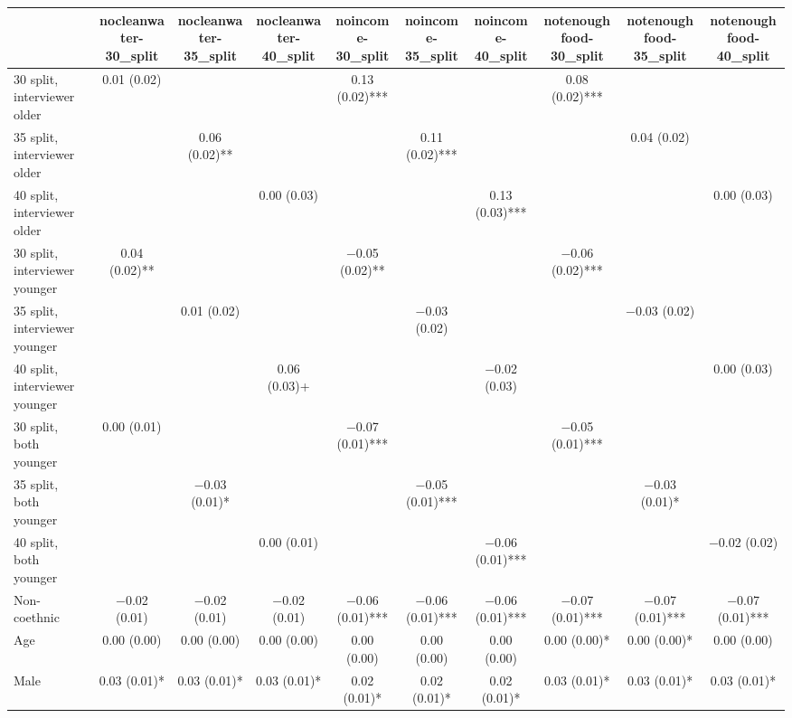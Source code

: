 \begin{table}
\centering
\begin{tabular}[t]{lccccccccc}
\toprule
  & nocleanwater-30\_split & nocleanwater-35\_split & nocleanwater-40\_split & noincome-30\_split & noincome-35\_split & noincome-40\_split & notenoughfood-30\_split & notenoughfood-35\_split & notenoughfood-40\_split\\
\midrule
30 split, interviewer older & \num{0.01} (\num{0.02}) &  &  & \num{0.13} (\num{0.02})*** &  &  & \num{0.08} (\num{0.02})*** &  & \\
35 split, interviewer older &  & \num{0.06} (\num{0.02})** &  &  & \num{0.11} (\num{0.02})*** &  &  & \num{0.04} (\num{0.02}) & \\
40 split, interviewer older &  &  & \num{0.00} (\num{0.03}) &  &  & \num{0.13} (\num{0.03})*** &  &  & \num{0.00} (\num{0.03})\\
30 split, interviewer younger & \num{0.04} (\num{0.02})** &  &  & \num{-0.05} (\num{0.02})** &  &  & \num{-0.06} (\num{0.02})*** &  & \\
35 split, interviewer younger &  & \num{0.01} (\num{0.02}) &  &  & \num{-0.03} (\num{0.02}) &  &  & \num{-0.03} (\num{0.02}) & \\
40 split, interviewer younger &  &  & \num{0.06} (\num{0.03})+ &  &  & \num{-0.02} (\num{0.03}) &  &  & \num{0.00} (\num{0.03})\\
30 split, both younger & \num{0.00} (\num{0.01}) &  &  & \num{-0.07} (\num{0.01})*** &  &  & \num{-0.05} (\num{0.01})*** &  & \\
35 split, both younger &  & \num{-0.03} (\num{0.01})* &  &  & \num{-0.05} (\num{0.01})*** &  &  & \num{-0.03} (\num{0.01})* & \\
40 split, both younger &  &  & \num{0.00} (\num{0.01}) &  &  & \num{-0.06} (\num{0.01})*** &  &  & \num{-0.02} (\num{0.02})\\
Non-coethnic & \num{-0.02} (\num{0.01}) & \num{-0.02} (\num{0.01}) & \num{-0.02} (\num{0.01}) & \num{-0.06} (\num{0.01})*** & \num{-0.06} (\num{0.01})*** & \num{-0.06} (\num{0.01})*** & \num{-0.07} (\num{0.01})*** & \num{-0.07} (\num{0.01})*** & \num{-0.07} (\num{0.01})***\\
Age & \num{0.00} (\num{0.00}) & \num{0.00} (\num{0.00}) & \num{0.00} (\num{0.00}) & \num{0.00} (\num{0.00}) & \num{0.00} (\num{0.00}) & \num{0.00} (\num{0.00}) & \num{0.00} (\num{0.00})* & \num{0.00} (\num{0.00})* & \num{0.00} (\num{0.00})\\
Male & \num{0.03} (\num{0.01})* & \num{0.03} (\num{0.01})* & \num{0.03} (\num{0.01})* & \num{0.02} (\num{0.01})* & \num{0.02} (\num{0.01})* & \num{0.02} (\num{0.01})* & \num{0.03} (\num{0.01})* & \num{0.03} (\num{0.01})* & \num{0.03} (\num{0.01})*\\

\end{tabular}
\end{table}
